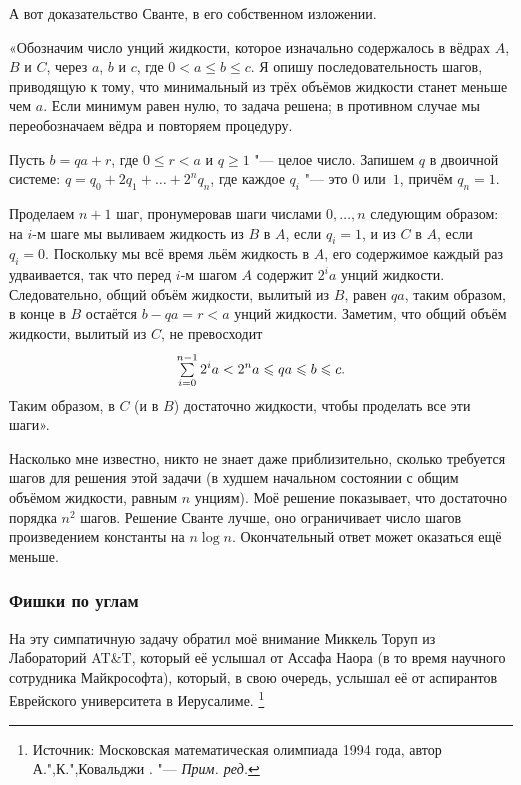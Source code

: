 \documentclass[twoside]{book}
\begin{document}
А вот доказательство Сванте, в его собственном изложении.

\medskip

«Обозначим число унций жидкости, которое изначально содержалось в вёдрах $A$, $B$ и $C$, через $a$, $b$ и $c$, где $0<a\le b\le c$.
Я опишу последовательность шагов, приводящую к тому, что минимальный из трёх объёмов жидкости станет меньше чем $a$.
Если минимум равен нулю, то задача решена; в противном случае мы переобозначаем вёдра и повторяем процедуру.

Пусть $b = qa + r$, где $0\le r<a$ и $q\ge 1$ "--- целое число.
Запишем $q$ в двоичной системе: $q=q_0+2q_1+\ldots+2^nq_n$, где каждое $q_i$ "--- это $0$ или~$1$, причём $q_n = 1$.

Проделаем $n+1$ шаг, пронумеровав шаги числами $0,\dots, n$ следующим образом: на $i$-м шаге  мы выливаем жидкость из $B$ в $A$, если $q_i = 1$, и из $C$ в $A$, если $q_i = 0$.
Поскольку мы всё время льём жидкость в $A$, его содержимое каждый раз удваивается, так что  перед $i$-м шагом $A$ содержит $2^ia$ унций жидкости.
Следовательно, общий объём жидкости, вылитый из $B$, равен $qa$, таким образом, в конце  в $B$ остаётся $b-qa=r<a$ унций жидкости.
Заметим, что общий объём жидкости, вылитый из $C$, не превосходит
\[
  \mathop{\textstyle\sum}\limits_{i=0}^{n-1} 2^ia<2^na\leqslant qa\leqslant b\leqslant c.\]
Таким образом, в $C$ (и в $B$) достаточно жидкости, чтобы проделать все эти шаги».
\heart

Насколько мне известно, никто не знает даже приблизительно, сколько требуется шагов для решения этой задачи (в худшем начальном состоянии с общим объёмом жидкости, равным $n$ унциям).
Моё решение показывает, что достаточно порядка $n^2$ шагов.
Решение Сванте лучше, оно ограничивает число шагов произведением константы на $n\log n$.
Окончательный ответ может оказаться ещё меньше.

\subsubsection*{Фишки по углам}%

На эту симпатичную задачу обратил моё внимание Миккель Торуп из Лабораторий AT\&T, %
который её услышал от Ассафа Наора %
(в то время научного сотрудника Майкрософта), который, в свою очередь, услышал её от аспирантов Еврейского университета в Иерусалиме.%
\footnote{Источник: Московская математическая олимпиада 1994 года, автор  А.",К.",Ковальджи \cite[№107751]{problems}. "--- \emph{Прим. ред.}}
\end{document}
